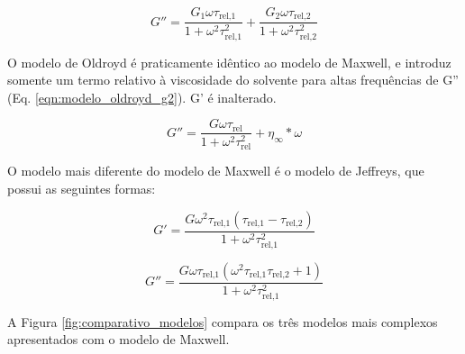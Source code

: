 			\begin{equation}
				G'' = \dfrac{  G_1 \omega  \tau_{\textrm{rel,1}}        }{ 1 + \omega^2 \tau_{\textrm{rel,1}}^2 } + \dfrac{  G_2 \omega  \tau_{\textrm{rel,2}}        }{ 1 + \omega^2 \tau_{\textrm{rel,2}}^2 }
			\label{eqn:modelo_doismodos_g2}
			\end{equation}
			
			
			O modelo de Oldroyd é praticamente idêntico ao modelo de Maxwell, e introduz somente um termo relativo à viscosidade do solvente para altas frequências de G'' (Eq. \ref{eqn:modelo_oldroyd_g2}). G' é inalterado.
			
			\begin{equation}
				G'' =\dfrac{  G \omega  \tau_{\textrm{rel}}        }{ 1 + \omega^2 \tau_{\textrm{rel}}^2 } + \eta_{\infty} * \omega
				\label{eqn:modelo_oldroyd_g2}
			\end{equation}
			
			O modelo mais diferente do modelo de Maxwell é o modelo de Jeffreys, que possui as seguintes formas:
			
			\begin{equation}
				G' = \dfrac{G \omega^{2} \tau_{\textrm{rel,1}} \left(\tau_{\textrm{rel,1}} - \tau_{\textrm{rel,2}}\right)}{1 + \omega^{2} \tau_{\textrm{rel,1}}^{2}}
				\label{eqn:modelo_jeffreys_g1}
			\end{equation}
			
			\begin{equation}
				G'' = \dfrac{G \omega \tau_{\textrm{rel,1}} \left(\omega^{2} \tau_{\textrm{rel,1}} \tau_{\textrm{rel,2}} + 1\right)}{1 + \omega^{2} \tau_{\textrm{rel,1}}^{2}}
				\label{eqn:modelo_jeffreys_g2}
			\end{equation}
			
			
			A Figura \ref{fig:comparativo_modelos} compara os três modelos mais complexos apresentados com o modelo de Maxwell. 
			
